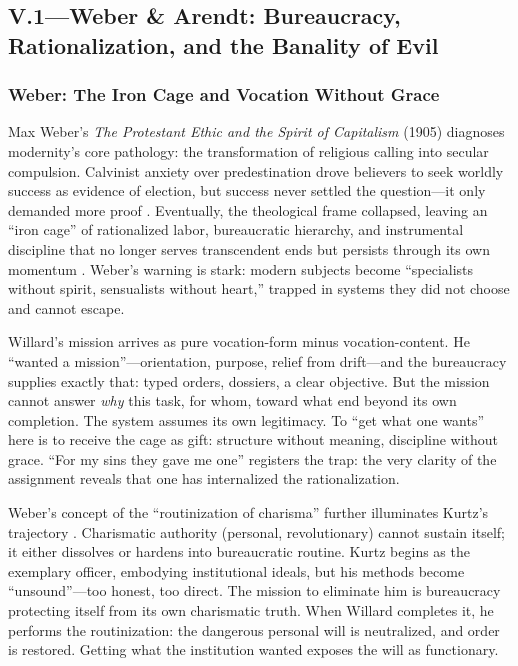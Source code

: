 \subsection*{V.1—Weber \& Arendt: Bureaucracy, Rationalization, and the Banality of Evil}
\label{ssec:v-weber-arendt}

\subsubsection*{Weber: The Iron Cage and Vocation Without Grace}
Max Weber's \textit{The Protestant Ethic and the Spirit of Capitalism} (1905) diagnoses
modernity's core pathology: the transformation of religious calling into secular compulsion.
Calvinist anxiety over predestination drove believers to seek worldly success as evidence of
election, but success never settled the question---it only demanded more proof
\parencite{WeberProtestant2002}. Eventually, the theological frame collapsed, leaving an ``iron
cage'' of rationalized labor, bureaucratic hierarchy, and instrumental discipline that no
longer serves transcendent ends but persists through its own momentum
\parencite{WeberProtestant2002}. Weber's warning is stark: modern subjects become ``specialists
without spirit, sensualists without heart,'' trapped in systems they did not choose and cannot
escape.

Willard's mission arrives as pure vocation-form minus vocation-content. He ``wanted a
mission''---orientation, purpose, relief from drift---and the bureaucracy supplies exactly
that: typed orders, dossiers, a clear objective. But the mission cannot answer \emph{why} this
task, for whom, toward what end beyond its own completion. The system assumes its own
legitimacy. To ``get what one wants'' here is to receive the cage as gift: structure without
meaning, discipline without grace. ``For my sins they gave me one'' registers the trap: the
very clarity of the assignment reveals that one has internalized the rationalization.

Weber's concept of the ``routinization of charisma'' further illuminates Kurtz's trajectory
\parencite{WeberProtestant2002}. Charismatic authority (personal, revolutionary) cannot sustain
itself; it either dissolves or hardens into bureaucratic routine. Kurtz begins as the
exemplary officer, embodying institutional ideals, but his methods become ``unsound''---too
honest, too direct. The mission to eliminate him is bureaucracy protecting itself from its own
charismatic truth. When Willard completes it, he performs the routinization: the dangerous
personal will is neutralized, and order is restored. Getting what the institution wanted
exposes the will as functionary.

